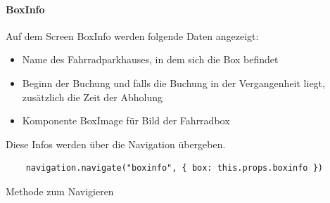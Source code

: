 \paragraph{BoxInfo}
Auf dem Screen BoxInfo werden folgende Daten angezeigt:\\
\begin{itemize}
  \item Name des Fahrradparkhauses, in dem sich die Box befindet
  \item Beginn der Buchung und falls die Buchung in der Vergangenheit liegt, zusätzlich die Zeit der Abholung
  \item Komponente BoxImage für Bild der Fahrradbox
\end{itemize}
Diese Infos werden über die Navigation übergeben.\\
\begin{listing}[H]
  \begin{verbatim}
    navigation.navigate("boxinfo", { box: this.props.boxinfo })
\end{verbatim}
  \caption{Methode zum Navigieren}
  \label{lst:navigation}
\end{listing}

